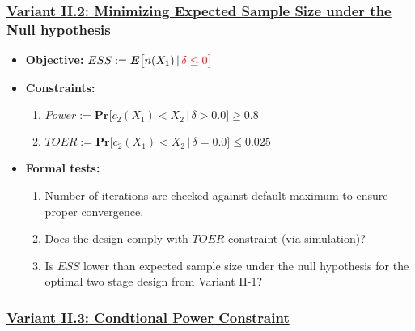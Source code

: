 \documentclass[
]{book}
\providecommand{\tightlist}{%
  \setlength{\itemsep}{0pt}\setlength{\parskip}{0pt}}
\begin{document}
\hypertarget{variant-ii.2-minimizing-expected-sample-size-under-the-null-hypothesis}{%
\subsubsection{\texorpdfstring{\protect\hyperlink{variantII_2}{Variant II.2: Minimizing Expected Sample Size under the Null hypothesis}}{Variant II.2: Minimizing Expected Sample Size under the Null hypothesis}}\label{variant-ii.2-minimizing-expected-sample-size-under-the-null-hypothesis}}

\begin{itemize}
\tightlist
\item
  \textbf{Objective:} \(ESS := \boldsymbol{E}\big[n(X_1)\,|\,\color{red}{\delta\leq 0}\big]\)
\item
  \textbf{Constraints:}

  \begin{enumerate}
  \def\labelenumi{\arabic{enumi}.}
  \tightlist
  \item
    \(Power := \boldsymbol{Pr}\big[c_2(X_1) < X_2\,|\,\delta> 0.0\big] \geq 0.8\)
  \item
    \(TOER := \boldsymbol{Pr}\big[c_2(X_1) < X_2\,|\,\delta=0.0\big] \leq 0.025\)
  \end{enumerate}
\item
  \textbf{Formal tests:}

  \begin{enumerate}
  \def\labelenumi{\arabic{enumi}.}
  \tightlist
  \item
    Number of iterations are checked against default maximum to ensure proper
    convergence.
  \item
    Does the design comply with \(TOER\) constraint (via simulation)?
  \item
    Is \(ESS\) lower than expected sample size under the null hypothesis
    for the optimal two stage design from Variant II-1?
  \end{enumerate}
\end{itemize}

\hypertarget{variant-ii.3-condtional-power-constraint}{%
\subsubsection{\texorpdfstring{\protect\hyperlink{variantII_3}{Variant II.3: Condtional Power Constraint}}{Variant II.3: Condtional Power Constraint}}\label{variant-ii.3-condtional-power-constraint}}
\end{document}
